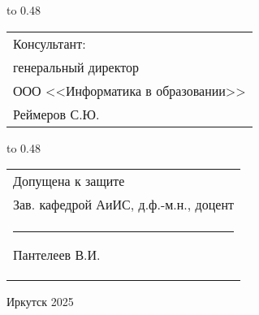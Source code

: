 {
\noindent\hbox to 0.48\textwidth {%
	\mbox{ } \hfil} %
	\begin{tabular}[t]{l}
		Консультант:\\
		генеральный директор \\
		ООО <<Информатика в образовании>>\\
		Реймеров С.Ю.		
	\end{tabular}		
}

\vspace{0.5cm}

{
	\noindent\hbox to 0.48\textwidth {%
		\mbox{ } \hfil} %
	\begin{tabular}[t]{l}
		Допущена к защите\\
		Зав. кафедрой АиИС, д.ф.-м.н., доцент \\
		\rule{2.7cm}{0.5pt} Пантелеев В.И.
	\end{tabular}		
}

\vspace{0.5cm}

\vfill 
\noindent
\begin{minipage}{\textwidth}
\centering	 Иркутск 2025
\end{minipage}